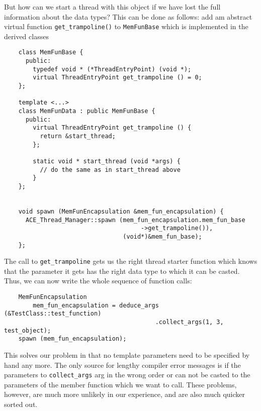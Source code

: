 \documentclass[11pt]{article}
\begin{document}
But how can we start a thread with this object if we have lost the full
information about the data types? This can be done as follows: add am abstract
virtual function \texttt{get\_trampoline()} to \texttt{MemFunBase} which is
implemented in the derived classes
\begin{verbatim}
    class MemFunBase {
      public:
        typedef void * (*ThreadEntryPoint) (void *);
        virtual ThreadEntryPoint get_trampoline () = 0;
    };

    template <...>
    class MemFunData : public MemFunBase {
      public:
        virtual ThreadEntryPoint get_trampoline () {
          return &start_thread;
        };

        static void * start_thread (void *args) {
          // do the same as in start_thread above
        }
    };


    void spawn (MemFunEncapsulation &mem_fun_encapsulation) {
      ACE_Thread_Manager::spawn (mem_fun_encapsulation.mem_fun_base
                                      ->get_trampoline()),
                                 (void*)&mem_fun_base);
    };
\end{verbatim}
The call to \texttt{get\_trampoline} gets us the right thread starter function
which knows that the parameter it gets has the right data type to which it can
be casted. Thus, we can now write the whole sequence of function calls:
\begin{verbatim}
    MemFunEncapsulation 
        mem_fun_encapsulation = deduce_args (&TestClass::test_function)
                                          .collect_args(1, 3, test_object);
    spawn (mem_fun_encapsulation);
\end{verbatim}
This solves our problem in that no template parameters need to be specified by
hand any more. The only source for lengthy compiler error messages is if the
parameters to \texttt{collect\_args} arg in the wrong order or can not be
casted to the parameters of the member function which we want to call. These
problems, however, are much more unlikely in our experience, and are also much
quicker sorted out.
\end{document}
